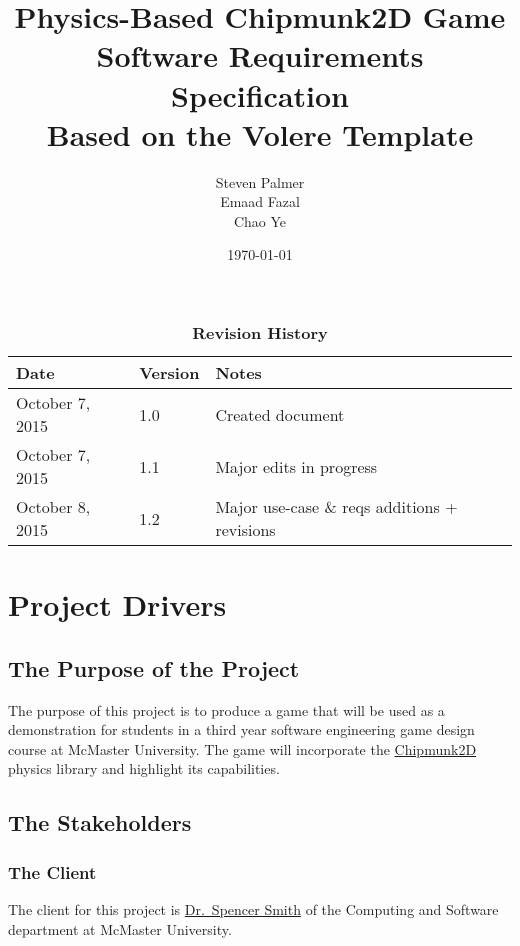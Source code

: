 \documentclass[12pt, titlepage]{article}
\begin{document}
\title{\bf Physics-Based Chipmunk2D Game\\[\baselineskip]\Large Software Requirements Specification\\[2\baselineskip] \large Based on the Volere Template}
\author{Steven Palmer\\Emaad Fazal\\Chao Ye}
\date{\today}
	
\maketitle

\tableofcontents
\listoftables

\begin{table}[bp]
\caption*{\bf Revision History}
\begin{tabularx}{\textwidth}{p{3cm}p{2cm}X}
\toprule {\bf Date} & {\bf Version} & {\bf Notes}\\
\midrule
October 7, 2015 & 1.0 & Created document\\
October 7, 2015 & 1.1 & Major edits in progress\\
October 8, 2015 & 1.2 & Major use-case \& reqs additions + revisions\\
\bottomrule
\end{tabularx}
\end{table}

\newpage
{}
\section{Project Drivers}
\subsection{The Purpose of the Project}
The purpose of this project is to produce a game that will be used as a demonstration for students in a third year software engineering game design course at McMaster University.  The game will incorporate the \href{https://chipmunk-physics.net/}{Chipmunk2D} physics library and highlight its capabilities.
\subsection{The Stakeholders}
\subsubsection{The Client}
The client for this project is \href{http://www.cas.mcmaster.ca/~smiths/}{Dr.~Spencer Smith} of the Computing and Software department at McMaster University.
\end{document}
